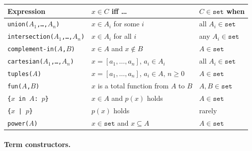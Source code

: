 \begin{center}
\footnotesize
\begin{tabular}{@{}p{4.5cm}p{4.8cm}p{3.0cm}@{}}
\toprule
Expression & $x \in C$ iff \ldots & $C \in \mathtt{set}$ when \\
\midrule
\texttt{union($A_1$,\ldots,$A_n$)} & $x \in A_i$ for some $i$ & all $A_i \in \mathtt{set}$ \\[2pt]
\texttt{intersection($A_1$,\ldots,$A_n$)} & $x \in A_i$ for all $i$ & any $A_i \in \mathtt{set}$ \\[2pt]
\texttt{complement-in($A$,$B$)} & $x \in A$ and $x \notin B$ & $A \in \mathtt{set}$ \\[2pt]
\texttt{cartesian($A_1$,\ldots,$A_n$)} & $x = [a_1,\ldots,a_n]$, $a_i \in A_i$ & all $A_i \in \mathtt{set}$ \\[2pt]
\texttt{tuples($A$)} & $x = [a_1,\ldots,a_n]$, $a_i \in A$, $n \ge 0$ & $A \in \mathtt{set}$ \\[2pt]
\texttt{fun($A$,$B$)} & $x$ is a total function from $A$ to $B$ & $A, B \in \mathtt{set}$ \\[2pt]
\texttt{\{$x$ in $A$: $p$\}} & $x \in A$ and $p(x)$ holds & $A \in \mathtt{set}$ \\[2pt]
\texttt{\{$x$ | $p$\}} & $p(x)$ holds & rarely \\[2pt]
\texttt{power($A$)} & $x \in \mathtt{set}$ and $x \subseteq A$ & $A \in \mathtt{set}$ \\
\bottomrule
\end{tabular}
\end{center}

\paragraph{Term constructors.}

